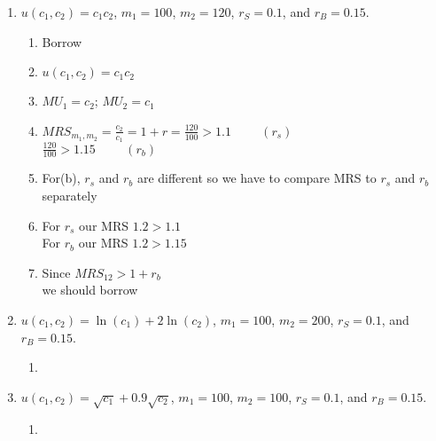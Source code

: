 \documentclass[11pt]{article}
\begin{document}
\begin{enumerate}
\begin{enumerate}
        \item $u(c_{1},c_{2})=c_{1}c_{2}$, $m_{1}=100$, $m_{2}=120$, $r_{S}=0.1$, and $r_{B}=0.15$.
        \begin{enumerate}
            \item Borrow
            \item $u(c_1,c_2) =c_1c_2$
            \item $MU_1 = c_2$; $MU_2 = c_1$
            \item $MRS_{{m_1},{m_2}} = \frac{c_2}{c_1} = 1 + r = \frac{120}{100} > 1.1 \hspace{1cm} (r_s)$ \\
            $\frac{120}{100} > 1.15 \hspace{1cm} (r_b)$
            \item For(b), $r_s$ and $r_b$ are different so we have to compare MRS to $r_s$ and $r_b$ separately
            \item For $r_s$ our MRS $1.2 > 1.1$\\
            For $r_b$ our MRS $1.2 > 1.15$
            \item Since $MRS_{12} > 1+r_b$\\
            we should borrow
        \end{enumerate}

        \item $u(c_{1},c_{2})=\ln(c_{1})+2\ln(c_{2})$, $m_{1}=100$, $m_{2}=200$, $r_{S}=0.1$, and $r_{B}=0.15$.
        \begin{enumerate}
            \item 
        \end{enumerate}

        \item $u(c_{1},c_{2})=\sqrt{c_{1}}+0.9\sqrt{c_{2}}$, $m_{1}=100$, $m_{2}=100$, $r_{S}=0.1$, and $r_{B}=0.15$.
        \begin{enumerate}
            \item 
        \end{enumerate}
    \end{enumerate}


\end{enumerate}
\end{document}
